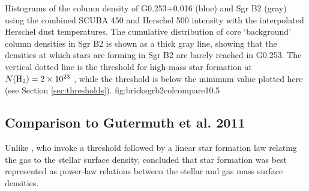 \documentclass[twocolumn]{aastex61}
\begin{document}
{Histograms of the column density of G0.253+0.016 (blue) and Sgr B2 (gray)
using the combined SCUBA 450 \um and Herschel 500 \um intensity with the
interpolated Herschel dust temperatures.  The cumulative distribution of core
`background' column densities in Sgr B2 is shown as a thick gray line, showing
that the densities at which stars are forming in Sgr B2 are barely
reached in G0.253.  The vertical dotted line is the \citet{Krumholz2008a}
threshold for high-mass star formation at $N(\textrm{H}_{2})=2\times10^{23}$ \persc, while
the \citet{Lada2010a} threshold is below the minimum value plotted here (see
Section \ref{sec:thresholds}).}
{fig:bricksgrb2colcompare}{1}{0.5\textwidth}

% 
% 

\subsection{Comparison to Gutermuth et al. 2011}
Unlike \citet{Lada2010a}, who invoke a threshold followed by a linear star
formation law relating the gas to the stellar surface density,
\citet{Gutermuth2011a} concluded that star formation was best represented as
power-law relations between the stellar and gas mass surface densities.
\end{document}
